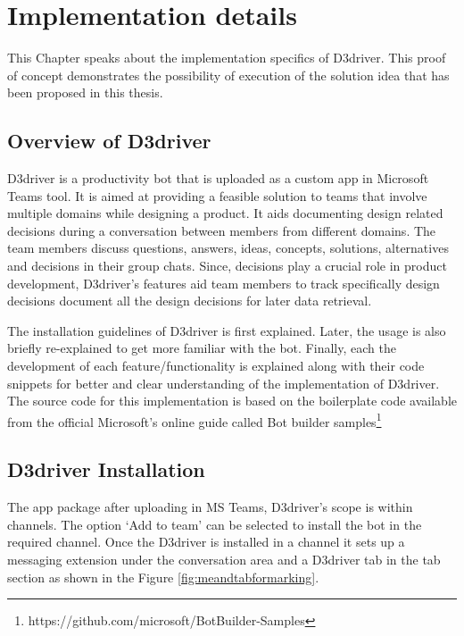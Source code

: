 \chapter{Implementation details}
\label{chap: id}

This Chapter speaks about the implementation specifics of D3driver. This proof of concept demonstrates the possibility of execution of the solution idea that has been proposed in this thesis. 

\section{Overview of D3driver}
D3driver is a productivity bot that is uploaded as a custom app in Microsoft Teams tool. It is aimed at providing a feasible solution to teams that involve multiple domains while designing a product. It aids documenting design related decisions during a conversation between members from different domains. The team members discuss questions, answers, ideas, concepts, solutions, alternatives and decisions in their group chats. Since, decisions play a crucial role in product development, D3driver's features aid team members to track specifically design decisions document all the design decisions for later data retrieval. 

The installation guidelines of D3driver is first explained. Later, the usage is also briefly re-explained to get more familiar with the bot. Finally, each the development of each feature/functionality is explained along with their code snippets for better and clear understanding of the implementation of D3driver. The source code for this implementation is based on the boilerplate code available from the official Microsoft's online guide called Bot builder samples\footnote{https://github.com/microsoft/BotBuilder-Samples}

\section{D3driver Installation} 
The app package after uploading in MS Teams, D3driver's scope is within channels. The option `Add to team' can be selected to install the bot in the required channel. Once the D3driver is installed in a channel it sets up a messaging extension under the conversation area and a D3driver tab in the tab section as shown in the Figure \ref{fig:meandtabformarking}. 

